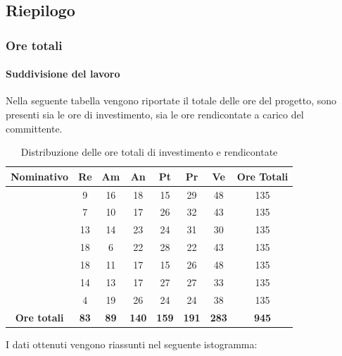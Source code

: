 \subsection{Riepilogo}
\subsubsection{Ore totali}
\paragraph{Suddivisione del lavoro}
Nella seguente tabella vengono riportate il totale delle ore del progetto, sono presenti sia le ore di investimento, sia le ore rendicontate a carico del committente.
\begin{table}[H]
		\begin{center}
			\setlength{\aboverulesep}{0pt}
			\setlength{\belowrulesep}{0pt}
			\setlength{\extrarowheight}{.75ex}
			\begin{tabular}{ c c c c c c c c }
				\rowcolor{AzzurroGruppo!30} 
				\textbf{Nominativo} & \textbf{Re} & \textbf{Am} & \textbf{An} & \textbf{Pt} & \textbf{Pr} & \textbf{Ve} & \textbf{Ore Totali}  \\
				\toprule
				\Davide    & 9 & 16 & 18 & 15 & 29 & 48 & 135 \\
				\Giosue    & 7 & 10 & 17 & 26 & 32 & 43 & 135 \\
				\Francesco & 13 & 14 & 23 & 24 & 31 & 30 & 135\\
				\Daniele   & 18 & 6 & 22 & 28 & 22 & 43 & 135\\
				\Lucrezia  & 18 & 11 & 17 & 15 & 26 & 48 & 135\\
				\Matteo    & 14 & 13 & 17 & 27 & 27 & 33 & 135\\
				\Tommaso   & 4 & 19 & 26 & 24 & 24 & 38 & 135\\
				 \textbf{Ore totali} & \textbf{83} & \textbf{89} & \textbf{140} & \textbf{159} & \textbf{191} & \textbf{283} & \textbf{945} \\
				\bottomrule
			\end{tabular}
			\caption{ Distribuzione delle ore totali di investimento e rendicontate}
		\end{center}
	\end{table}
	I dati ottenuti vengono riassunti nel seguente istogramma:
